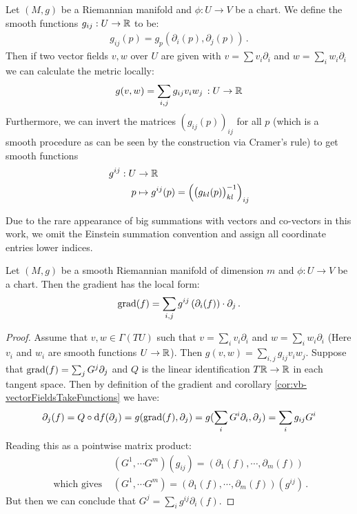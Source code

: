 \begin{definition}\label{def:vb-localDescriptionOfGradientGij}
	Let $(M,g)$ be a Riemannian manifold and $\phi:U\to V$ be a chart. We define the smooth functions $g_{ij}:U\to \mathbb{R}$ to be:
	\begin{align*}
		g_{ij}(p)=g_p(\partial_i(p),\partial_j(p)) \, .
	\end{align*}
	Then if two vector fields $v,w$ over $U$ are given with $v=\sum v_i \partial_i$ and $w=\sum _i w_i \partial_i$ we can calculate the metric locally:
	\begin{align*}
		g(v,w)=\sum_{i,j}g_{ij} v_iw_j\, :U\to \mathbb{R}
	\end{align*} Furthermore, we can invert the matrices $(g_{ij}(p))_{ij}$ for all $p$ (which is a smooth procedure as can be seen by the construction via Cramer's rule) to get smooth functions 
	\begin{align*}
		g^{ij}: U&\to \mathbb{R}\\
		p&\mapsto g^{ij}(p)= \left( \big(g_{kl}(p)\big)_{kl}^{-1} \right)_{ij}
	\end{align*}
\end{definition}
\begin{remark}
	Due to the rare appearance of big summations with vectors and co-vectors in this work, we omit the Einstein summation convention and assign all coordinate entries lower indices. 
\end{remark}



\begin{lemma}\label{lem:vb-localDescriptionOfGradient}
	Let $(M,g)$ be a smooth Riemannian manifold of dimension $m$ and $\phi:U\to V$ be a chart. Then the gradient has the local form:
	\begin{align*}
		\mathrm{grad}(f) =\sum_{i,j}g^{ij}  \left(\partial_i (f) \right)\cdot  \partial_j \, .
	\end{align*}
\end{lemma}

\begin{proof} Assume that $v,w\in \Gamma( TU)$ such that $v=\sum_i v_i\partial_i$ and $w=\sum_i w_i\partial _i$ (Here $v_i$ and $w_i$ are smooth functions $U\to \mathbb{R}$). Then  $g(v,w)=\sum_{i,j} g_{ij} v_i w_j$.
	Suppose that $\mathrm{grad}(f)=\sum_j G^j \partial_j$ and $Q$ is the linear identification $T\mathbb{R}\to \mathbb{R}$ in each tangent space. Then by definition of the gradient and corollary \ref{cor:vb-vectorFieldsTakeFunctions} we have:
	\begin{align*}
		\partial_j(f)=	Q \circ \mathop{}\!\mathrm{d} f (\partial_j)= g(\mathrm{grad}(f),\partial_j)= g(\sum_i G^i \partial_i,\partial_j)=\sum_{i}g_{ij} G^i
	\end{align*} Reading this as a pointwise matrix product:
	\begin{align*}
		&(G^1,\cdots G^m)(g_{ij})=\left(\partial_1 (f),\cdots,\partial_m (f)  \right) \\
		\text{ which gives } &(G^1,\cdots G^m)=\left(\partial_1 (f),\cdots,\partial_m (f)  \right) (g^{ij})\, .
	\end{align*}  But then we can conclude that $G^j=\sum_i g^{ij}\partial_i (f)$.
	
\end{proof}


